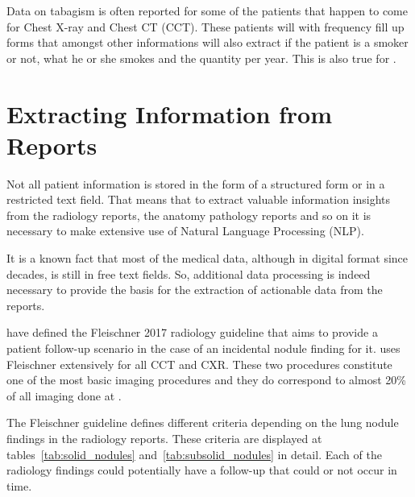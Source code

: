 Data on tabagism is often reported for some of the patients that happen to come for Chest X-ray and Chest CT (CCT). These patients will with frequency fill up forms that amongst other informations will also extract if the patient is a smoker or not, what he or she smokes and the quantity per year. This is also true for \nomeHsl{}. 

\section{Extracting Information from Reports}

Not all patient information is stored in the form of a structured form or in a restricted text field. That means that to extract valuable information insights from the radiology reports, the anatomy pathology reports and so on it is necessary to make extensive use of Natural Language Processing (NLP). %

It is a known  fact that most of the medical data, although in digital format since decades, is still in free text fields. %
So, additional data processing is indeed necessary to provide the basis for the extraction of actionable data from the reports.

 have defined the Fleischner 2017 radiology guideline that aims to provide a patient follow-up scenario in the case of an incidental nodule finding for it. \nomeHsl{} uses Fleischner extensively for all CCT and CXR. These two procedures constitute one of the most basic imaging procedures and they do correspond to almost 20\% of all imaging done at \nomeHslShort{}. %

The Fleischner guideline defines different criteria depending on the lung nodule findings in the radiology reports. These criteria are displayed at tables~\ref{tab:solid_nodules} and~\ref{tab:subsolid_nodules} in detail. Each of the radiology findings could potentially have a follow-up that could or not occur in time.

